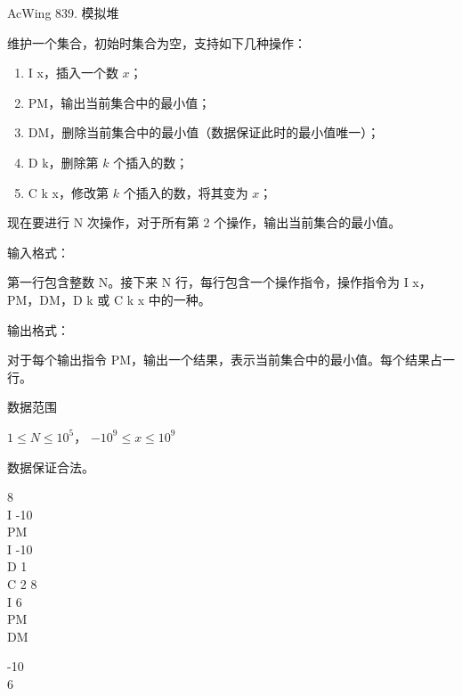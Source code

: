 \begin{titledbox}{AcWing 839. 模拟堆}

维护一个集合，初始时集合为空，支持如下几种操作：

\begin{enumerate}
    \itemsep=-5pt
    \item I x，插入一个数 $x$；
    \item PM，输出当前集合中的最小值；
    \item DM，删除当前集合中的最小值（数据保证此时的最小值唯一）；
    \item D k，删除第 $k$ 个插入的数；
    \item C k x，修改第 $k$ 个插入的数，将其变为 $x$；
\end{enumerate}

现在要进行 N 次操作，对于所有第 2 个操作，输出当前集合的最小值。

输入格式：

第一行包含整数 N。接下来 N 行，每行包含一个操作指令，操作指令为 I x，PM，DM，D k 或 C k x 中的一种。

输出格式：

对于每个输出指令 PM，输出一个结果，表示当前集合中的最小值。每个结果占一行。

数据范围

$1 \le N \le 10^5$， $−10^9 \le x \le 10^9$

数据保证合法。

\begin{inputblock}
    8 \\
    I -10 \\
    PM \\
    I -10 \\
    D 1 \\
    C 2 8 \\
    I 6 \\
    PM \\
    DM
\end{inputblock}
\begin{outputblock}
    -10 \\
    6
\end{outputblock}
\end{titledbox}

